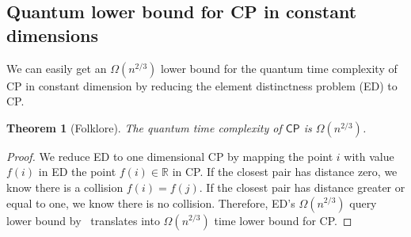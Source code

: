 \documentclass[10pt,a4paper]{article}
\newtheorem{theorem}{Theorem}
\newcommand{\CP}{\ensuremath{\mathsf{CP}}}
\begin{document}
  



\subsection{Quantum lower bound for \textsf{CP} in constant dimensions}
\label{sec:cp-lo}
We can easily get an $\Omega(n^{2/3})$ lower bound for the quantum time complexity of \textsf{CP} in constant dimension by reducing the element distinctness problem (\textsf{ED}) to \textsf{CP}. 

\begin{theorem}[Folklore]\label{thm:cp_constant}
The quantum time complexity of $\CP$ is  $\Omega(n^{2/3})$.
\end{theorem}
\begin{proof}
We reduce \textsf{ED} to one dimensional \textsf{CP} by mapping the point $i$ with value $f(i)$ in  \textsf{ED}  the point $f(i) \in \mathbb{R}$ in \textsf{CP}. If the closest pair has distance zero, we know there is a collision $f(i)=f(j)$. If the closest pair has distance greater or equal to one, we know there is no collision. Therefore, \textsf{ED}'s  $\Omega(n^{2/3})$ query lower bound by~\cite{r1} translates into  $\Omega(n^{2/3})$ time lower bound  for \textsf{CP}.
\end{proof}
\end{document}
